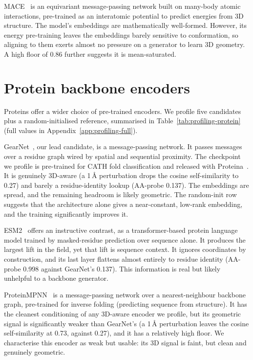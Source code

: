 \documentclass[12pt,a4paper,twoside]{report}
\begin{document}
MACE~\cite{MACE} is an equivariant message-passing network built on many-body atomic interactions, pre-trained as an interatomic potential to predict energies from 3D structure. The model's embeddings are mathematically well-formed. However, its energy pre-training leaves the embeddings barely sensitive to conformation, so aligning to them exerts almost no pressure on a generator to learn 3D geometry. A high floor of 0.86 further suggests it is mean-saturated.

\section{Protein backbone encoders}
\label{sec:profiling-protein}



Proteins offer a wider choice of pre-trained encoders. We profile five candidates plus a random-initialised reference, summarised in Table~\ref{tab:profiling-protein} (full values in Appendix~\ref{app:profiling-full}).

GearNet~\cite{GearNet}, our lead candidate, is a message-passing network. It passes messages over a residue graph wired by spatial and sequential proximity. The checkpoint we profile is pre-trained for CATH fold classification and released with Proteina~\cite{Proteina}. It is genuinely 3D-aware (a 1\,\AA{} perturbation drops the cosine self-similarity to 0.27) and barely a residue-identity lookup (AA-probe 0.137). The embeddings are spread, and the remaining headroom is likely geometric. The random-init row suggests that the architecture alone gives a near-constant, low-rank embedding, and the training significantly improves it.

ESM2~\cite{ESM2} offers an instructive contrast, as a transformer-based protein language model trained by masked-residue prediction over sequence alone. It produces the largest lift in the field, yet that lift is sequence context. It ignores coordinates by construction, and its last layer flattens almost entirely to residue identity (AA-probe 0.998 against GearNet's 0.137). This information is real but likely unhelpful to a backbone generator.

ProteinMPNN~\cite{ProteinMPNN} is a message-passing network over a nearest-neighbour backbone graph, pre-trained for inverse folding (predicting sequence from structure). It has the cleanest conditioning of any 3D-aware encoder we profile, but its geometric signal is significantly weaker than GearNet's (a 1\,\AA{} perturbation leaves the cosine self-similarity at 0.73, against 0.27), and it has a relatively high floor. We characterise this encoder as weak but usable: its 3D signal is faint, but clean and genuinely geometric.
\end{document}
